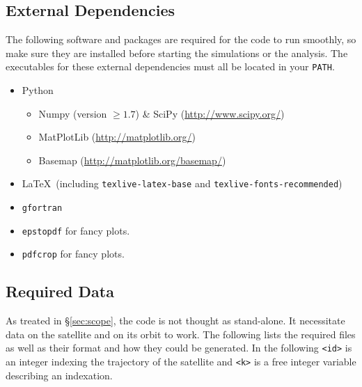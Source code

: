 \documentclass[a4paper,10pt]{article}
\newcommand{\httplink}[1]{{\href{#1}{#1}}}
\begin{document}
\subsection{External Dependencies}
The following software and packages are required for the code to run smoothly, so make sure they are installed before starting the simulations or the analysis. The executables for these external dependencies must all be located in your \verb=PATH=. 
\begin{itemize}
 \item Python
 \begin{itemize}
  \item Numpy (version $\geq 1.7$) \& SciPy (\httplink{http://www.scipy.org/})
  \item MatPlotLib (\httplink{http://matplotlib.org/})
  \item Basemap (\httplink{http://matplotlib.org/basemap/})
 \end{itemize}
  \item \LaTeX\ (including \verb=texlive-latex-base= and \verb=texlive-fonts-recommended=)
  \item \verb=gfortran=
  \item \verb=epstopdf= for fancy plots.
  \item \verb=pdfcrop= for fancy plots.
\end{itemize}
\subsection{Required Data}
As treated in \S\ref{sec:scope}, the code is not thought as stand-alone. It necessitate data on the satellite and on its orbit to work. The following lists the required files as well as their format and how they could be generated. In the following \verb=<id>= is an integer indexing the trajectory of the satellite and \verb=<k>= is a free integer variable describing an indexation.
\end{document}
